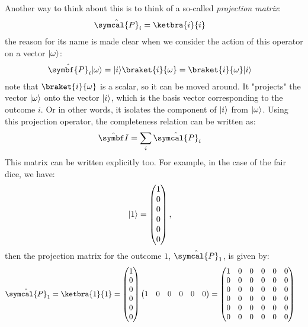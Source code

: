 Another way to think about this is to think of a so-called \emph{projection matrix}:
\begin{align}
  \hat{\symcal{P}}_i & = \ketbra{i}{i}
\end{align}
the reason for its name is made clear when we consider the action of this operator on a vector $\lvert\omega\rangle$:
\begin{align}
  \hat{\symbf{P}}_i \ket{\omega} & = \ket{i} \braket{i}{\omega} = \braket{i}{\omega} \ket{i}
\end{align}
note that $\braket{i}{\omega}$ is a scalar, so it can be moved around.
It "projects" the vector $\lvert\omega\rangle$ onto the vector $\lvert i\rangle$, which is the basis vector corresponding to the outcome $i$.
Or in other words, it isolates the component of $\lvert i\rangle$ from $\lvert\omega\rangle$.
Using this projection operator, the completeness relation can be written as:
\begin{align}
  \idty & = \sum_{i} \hat{\symcal{P}}_i
\end{align}
This matrix can be written explicitly too. For example, in the case of the fair dice, we have:
\begin{align}
  \lvert1\rangle & = \begin{pmatrix}
                1 \\
                0 \\
                0 \\
                0 \\
                0 \\
                0
              \end{pmatrix},
\end{align}
then the projection matrix for the outcome $1$, $\hat{\symcal{P}}_1$, is given by:
\begin{align}
  \hat{\symcal{P}}_1 = \ketbra{1}{1} = \begin{pmatrix}
                                         1 \\
                                         0 \\
                                         0 \\
                                         0 \\
                                         0 \\
                                         0
                                       \end{pmatrix}
  \begin{pmatrix}
    1 & 0 & 0 & 0 & 0 & 0
  \end{pmatrix}
   & = \begin{pmatrix}
         1 & 0 & 0 & 0 & 0 & 0 \\
         0 & 0 & 0 & 0 & 0 & 0 \\
         0 & 0 & 0 & 0 & 0 & 0 \\
         0 & 0 & 0 & 0 & 0 & 0 \\
         0 & 0 & 0 & 0 & 0 & 0 \\
         0 & 0 & 0 & 0 & 0 & 0
       \end{pmatrix}
\end{align}
